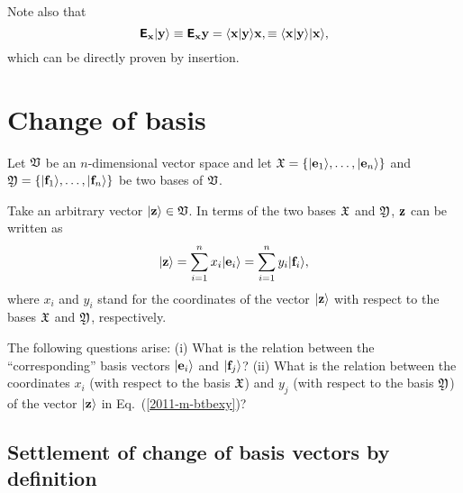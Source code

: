 Note also that
\begin{equation}
\textsf{\textbf{E}}_{\bf x} \vert {\bf y}\rangle
\equiv
\textsf{\textbf{E}}_{\bf x} {\bf y}
=
\langle {\bf x}\vert  {\bf y} \rangle {\bf x},
\equiv
\langle {\bf x}\vert  {\bf y} \rangle \vert {\bf x}\rangle ,
\end{equation}
which can be directly proven by insertion.







\section{Change of basis}
\label{2012-m-ch-fdlvs-changeofbasis}

Let ${\frak V}$ be an $n$-dimensional vector space and let
${\frak X}
=
\{
\vert {\bf e}_1 \rangle ,
\ldots ,
\vert {\bf e}_n \rangle
\}$
and
${\frak Y}
=  \{
\vert {\bf f}_1 \rangle ,
\ldots ,
\vert {\bf f}_n \rangle
\}$ be two bases of ${\frak V}$.

Take an arbitrary vector $\vert {\bf z} \rangle \in {\frak V}$.
In terms of the two bases
${\frak X}$ and
${\frak Y}$,
${\bf z}$ can be written as
\begin{equation}
\vert {\bf z}  \rangle =
\sum_{i=1}^n x_i\vert {\bf e}_i \rangle
=
\sum_{i=1}^n  y_i\vert {\bf f}_i \rangle ,
\label{2011-m-btbexy}
\end{equation}
where $x_i$ and $y_i$ stand for the coordinates of the vector  $\vert {\bf z}  \rangle $
with respect to the bases ${\frak X}$ and
${\frak Y}$,
respectively.

The following questions arise:
(i)
What is the relation between the ``corresponding'' basis vectors $\vert {\bf e}_i \rangle $ and $\vert {\bf f}_j \rangle $?
(ii)
What is the relation between the coordinates $x_i$ (with respect to the basis  ${\frak X}$) and $y_j$ (with respect to the basis  ${\frak Y}$)
of the vector $\vert {\bf z}  \rangle $ in Eq.~(\ref{2011-m-btbexy})?


\subsection{Settlement of change of basis vectors by definition}

